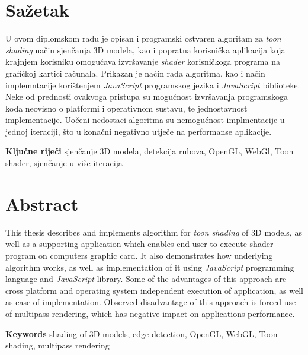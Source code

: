 \section*{Sažetak}

U ovom diplomskom radu je opisan i programski ostvaren algoritam za \emph{toon shading} način sjenčanja 3D modela, kao i popratna korisnička aplikacija koja krajnjem korisniku omogućava izvršavanje \emph{shader} korisničkoga programa na grafičkoj kartici računala. Prikazan je način rada algoritma, kao i način implemntacije korištenjem \emph{JavaScript} programskog jezika i \emph{JavaScript} biblioteke. Neke od prednosti ovakvoga pristupa su mogućnost izvršavanja programskoga koda neovisno o platformi i operativnom sustavu, te jednostavnost implementacije. Uočeni nedostaci algoritma su nemogućnost implmentacije u jednoj iteraciji, što u konačni negativno utječe na performanse aplikacije.

\textbf{Ključne riječi} sjenčanje 3D modela, detekcija rubova, OpenGL, WebGl, Toon shader, sjenčanje u više iteracija

\section*{Abstract}

This thesis describes and implements algorithm for \emph{toon shading} of 3D models, as well as a supporting application which enables end user to execute shader program on computers graphic card.  It also demonstrates how underlying algorithm works, as well as implementation of it using \emph{JavaScript} programming language and \emph{JavaScript} library. Some of the advantages of this approach are cross platform and operating system independent execution of application, as well as ease of implementation. Observed disadvantage of this approach is forced use of multipass rendering, which has negative impact on applications performance.


\textbf{Keywords} shading of 3D models, edge detection, OpenGL, WebGL, Toon shading, multipass rendering